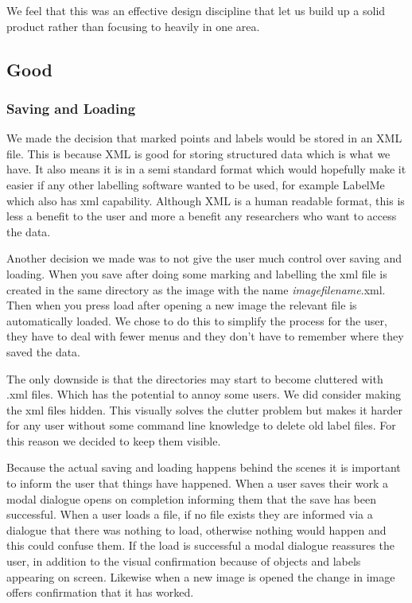 \documentclass[a4paper,11pt,oneside]{article}
\begin{document}
We feel that this was an effective design discipline that let us build up a solid product rather than focusing to heavily in one area.

\subsection{Good}

\subsubsection{Saving and Loading}
We made the decision that marked points and labels would be stored in an XML
file.  This is because XML is good for storing structured data which is what we
have.  It also means it is in a semi standard format which would hopefully make
it easier if any other labelling software wanted to be used, for example LabelMe
which also has xml capability.  Although XML is a human readable format, this is
less a benefit to the user and more a benefit any researchers who want to access
the data.

Another decision we made was to not give the user much control over saving and
loading.  When you save after doing some marking and labelling the xml file is
created in the same directory as the image with the name
\emph{imagefilename}.xml.  Then when you press load after opening a new image
the relevant file is automatically loaded.  We chose to do this to simplify the
process for the user, they have to deal with fewer menus and they don't have to
remember where they saved the data.

The only downside is that the directories may start to become cluttered with .xml files.  Which has the potential to annoy some users.  We did consider making the xml files hidden.  This visually solves the clutter problem but makes it harder for any user without some command line knowledge to delete old label files.  For this reason we decided to keep them visible.

Because the actual saving and loading happens behind the scenes it is important
to inform the user that things have happened.  When a user saves their work a
modal dialogue opens on completion informing them that the save has been
successful. When a user loads a file, if no file exists they are informed via a
dialogue that there was nothing to load, otherwise nothing would happen and this
could confuse them.  If the load is successful a modal dialogue reassures the
user, in addition to the visual confirmation because of objects and
labels appearing on screen. Likewise when a new image is opened the change in
image offers confirmation that it has worked.
\end{document}
